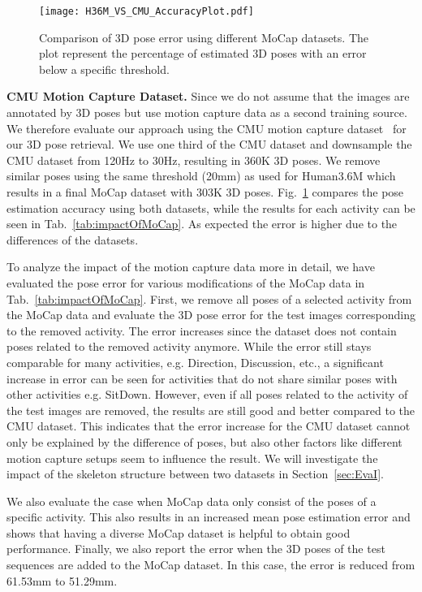 \documentclass[10pt,journal,compsoc]{IEEEtran}
\makeatletter
\newcommand*{\eg}{e.g.\@\xspace}
\makeatother
\begin{document}
\begin{figure}[t]
\begin{center}
\texttt{[image: H36M\_VS\_CMU\_AccuracyPlot.pdf]}
\end{center}
   \caption{Comparison of 3D pose error using different MoCap datasets. The plot represent the percentage of estimated 3D poses with an error below a specific threshold.}
\label{fig:H36M_VS_CMU_AccuracyPlot}
\end{figure}

\noindent\textbf{CMU Motion Capture Dataset.}
Since we do not assume that the images are annotated by 3D poses but use motion capture data as a second training source.
We therefore evaluate our approach using the CMU motion capture dataset~\cite{cmu_mocap} for our 3D pose retrieval. 
We use one third of the CMU dataset and downsample the CMU dataset from 120Hz to 30Hz, resulting in 360K 3D poses. 
We remove similar poses using the same threshold (20mm) as used for Human3.6M which results in a final MoCap dataset with 303K 3D poses.
Fig.~\ref{fig:H36M_VS_CMU_AccuracyPlot} compares the pose estimation accuracy using both datasets, while the results for each activity 
can be seen in Tab.~\ref{tab:impactOfMoCap}. As expected the error is higher due to the differences of the datasets. 

To analyze the impact of the motion capture data more in detail, we have evaluated the pose error for various modifications of the MoCap data in Tab.~\ref{tab:impactOfMoCap}. 
First, we remove all poses of a selected activity from the MoCap data and evaluate the 3D pose error 
for the test images corresponding to the removed activity. The error increases since the dataset 
does not contain poses related to the removed activity anymore. While the error still stays comparable for many activities, \eg Direction, Discussion, etc., a significant increase in error can be seen for activities that do not share similar 
poses with other activities \eg SitDown. However, even if all poses related to the activity of the test images are removed, the results are still good and better compared to the CMU dataset. This indicates that the error increase for the CMU dataset cannot only be explained by the difference of poses, but also other factors like different motion capture setups seem to influence the result. We will investigate the impact of the skeleton structure between two datasets in Section~\ref{sec:EvaI}.

We also evaluate the case when MoCap data only consist of the poses of a specific activity. 
This also results in an increased mean pose estimation error and shows that having a diverse MoCap dataset is helpful to obtain good performance. 
Finally, we also report the error when the 3D poses of the test sequences are added to the MoCap dataset. 
In this case, the error is reduced from 61.53mm to 51.29mm. 
\end{document}

